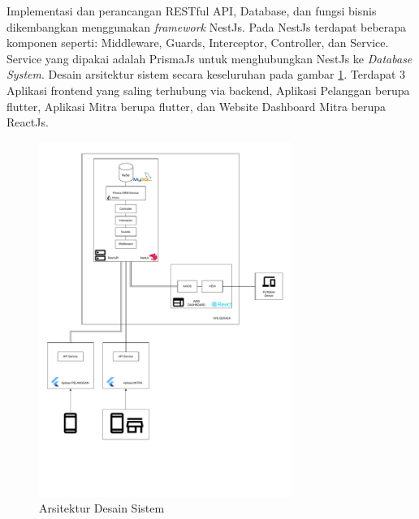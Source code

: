 Implementasi dan perancangan RESTful API, Database, dan fungsi bisnis dikembangkan menggunakan \textit{framework} NestJs. Pada NestJs terdapat beberapa komponen seperti: Middleware, Guards, Interceptor, Controller, dan Service. Service yang dipakai adalah PrismaJs untuk menghubungkan NestJs ke \textit{Database System}. Desain arsitektur sistem secara keseluruhan pada gambar \ref{sistem-desain-arsitektur}. Terdapat 3 Aplikasi frontend yang saling terhubung via backend, Aplikasi Pelanggan berupa flutter, Aplikasi Mitra berupa flutter, dan Website Dashboard Mitra berupa ReactJs.
\begin{figure}[h]
	\centering
	\includegraphics[width=0.73\textwidth]{drawio/System-Design-Architecture.drawio.pdf}
	\caption{Arsitektur Desain Sistem}
	\label{sistem-desain-arsitektur}
\end{figure}
\newpage
